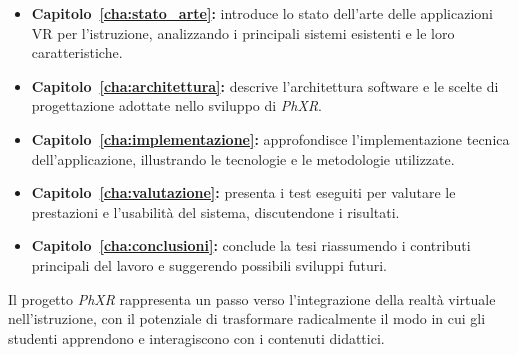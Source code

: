 \begin{itemize}
  \item \textbf{Capitolo~\ref{cha:stato_arte}:} introduce lo stato dell'arte
    delle applicazioni VR per l’istruzione, analizzando i principali sistemi esistenti
    e le loro caratteristiche.

  \item \textbf{Capitolo~\ref{cha:architettura}:} descrive l’architettura
    software e le scelte di progettazione adottate nello sviluppo di \emph{PhXR}.

  \item \textbf{Capitolo~\ref{cha:implementazione}:} approfondisce
    l’implementazione tecnica dell’applicazione, illustrando le tecnologie e le metodologie
    utilizzate.

  \item \textbf{Capitolo~\ref{cha:valutazione}:} presenta i test eseguiti per
    valutare le prestazioni e l’usabilità del sistema, discutendone i risultati.

  \item \textbf{Capitolo~\ref{cha:conclusioni}:} conclude la tesi riassumendo i
    contributi principali del lavoro e suggerendo possibili sviluppi futuri.
\end{itemize}

Il progetto \emph{PhXR} rappresenta un passo verso l’integrazione della realtà
virtuale nell'istruzione, con il potenziale di trasformare radicalmente il modo in
cui gli studenti apprendono e interagiscono con i contenuti didattici.